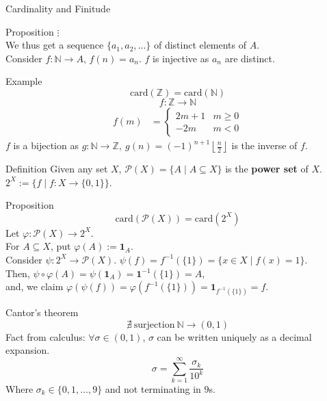\documentclass[10pt]{extarticle}
\begin{document}
\begin{problem}{Cardinality and Finitude}
\begin{problem}{Proposition}
      $\vdots$\\

      We thus get a sequence $\{a_1,a_2,\dots\}$ of distinct elements of $A$.\\

      Consider $f:\mathbb{N} \rightarrow A$, $f(n) = a_n$. $f$ is injective as $a_n$ are distinct.
    \end{problem}
    \begin{problem}{Example}
      \[
        \textrm{card}(\mathbb{Z}) = \textrm{card}(\mathbb{N})
      \] 
      \tcblower
      \[
        f:\mathbb{Z} \rightarrow \mathbb{N}
      \] 
      \begin{align*}
        f(m) &= \begin{cases}
          2m + 1 & m\geq 0\\
          -2m & m<0
        \end{cases}
      \end{align*}
      $f$ is a bijection as $g:\mathbb{N} \rightarrow \mathbb{Z},~g(n) = (-1)^{n+1}\left\lfloor \frac{n}{2}\right\rfloor$ is the inverse of $f$.
    \end{problem}
    \begin{problem}{Definition}
      Given any set $X$, $\mathcal{P}(X) = \{A \mid A\subseteq X\}$ is the \textbf{power set} of $X$.\\

      $2^X:= \{f\mid f:X\rightarrow \{0,1\}\}$.
    \end{problem}
    \begin{problem}{Proposition}
      \[
        \textrm{card}(\mathcal{P}(X)) = \textrm{card}(2^X)
      \] 
      \tcblower
      Let $\varphi: \mathcal{P}(X) \rightarrow 2^X$.\\

      For $A\subseteq X$, put $\varphi(A) := \mathbf{1}_A$.\\

      Consider $\psi: 2^X \rightarrow \mathcal{P}(X)$. $\psi(f) = f^{-1}(\{1\}) = \{x\in X \mid f(x) = 1\}$.\\

      Then, $\psi\circ\varphi(A) = \psi(\mathbf{1}_A) = \mathbf{1}^{-1}(\{1\}) = A$,\\

      and, we claim $\varphi(\psi(f)) = \varphi(f^{-1}(\{1\})) = \mathbf{1}_{f^{-1}(\{1\})} = f$.
    \end{problem}
    \begin{problem}{Cantor's theorem}
      \[
        \nexists~\textrm{surjection}~\mathbb{N}\rightarrow (0,1)
      \] 
      \tcblower
      Fact from calculus: $\forall \sigma\in (0,1)$, $\sigma$ can be written uniquely as a decimal expansion.
      \[
        \sigma = \sum_{k=1}^{\infty} \frac{\sigma_k}{10^k}
      \] 
      Where $\sigma_k\in \{0,1,\dots,9\}$ and not terminating in $9$s.\\


\end{problem}
\end{problem}
\end{document}
